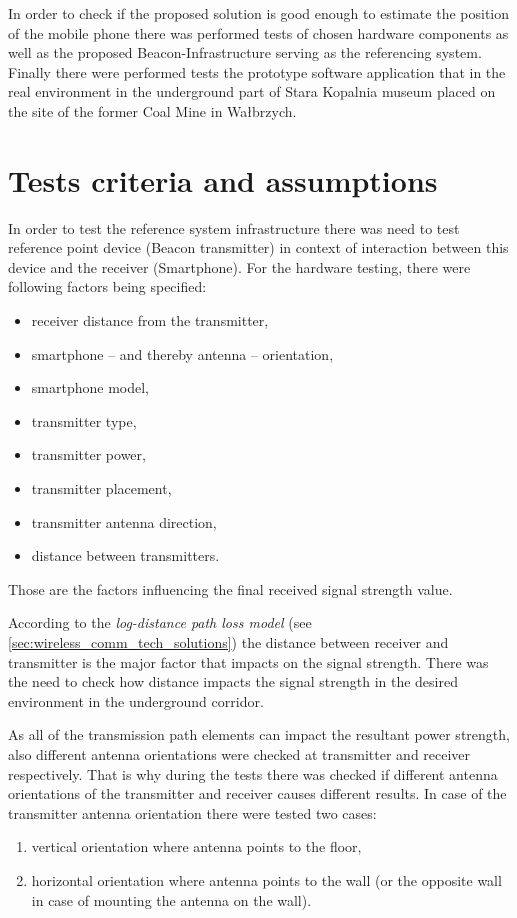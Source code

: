 \documentclass[../main.tex]{subfiles}
\begin{document}
In order to check if the proposed solution is good enough to estimate the position of the mobile phone there was performed tests of chosen hardware components as well as the proposed Beacon-Infrastructure serving as the referencing system. Finally there were performed tests the prototype software application that in the real environment in the underground part of Stara Kopalnia museum placed on the site of the former Coal Mine in Wałbrzych.

\section{Tests criteria and assumptions} %
\label{sec:tests_criteria_and_assumptions}

In order to test the reference system infrastructure there was need to test reference point device (Beacon transmitter) in context of interaction between this device and the receiver (Smartphone). For the hardware testing, there were following factors being specified:
\begin{itemize}
	\item receiver distance from the transmitter,
	\item smartphone -- and thereby antenna -- orientation,
	\item smartphone model,
	\item transmitter type,
	\item transmitter power,
	\item transmitter placement,
	\item transmitter antenna direction,
	\item distance between transmitters.
\end{itemize}

Those are the factors influencing the final received signal strength value.

According to the \textit{log-distance path loss model} \cite{RSSI_path_loss_prediction_model} (see \ref{sec:wireless_comm_tech_solutions}) the distance between receiver and transmitter is the major factor that impacts on the signal strength. There was the need to check how distance impacts the signal strength in the desired environment in the underground corridor.

As all of the transmission path elements can impact the resultant power strength, also different antenna orientations were checked at transmitter and receiver respectively. That is why during the tests there was checked if different antenna orientations of the transmitter and  receiver causes different results. In case of the transmitter antenna orientation there were tested two cases:
\begin{enumerate}
	\item vertical orientation where antenna points to the floor,
	\item horizontal orientation where antenna points to the wall (or the opposite wall in case of mounting the antenna on the wall).
\end{enumerate}
\end{document}
